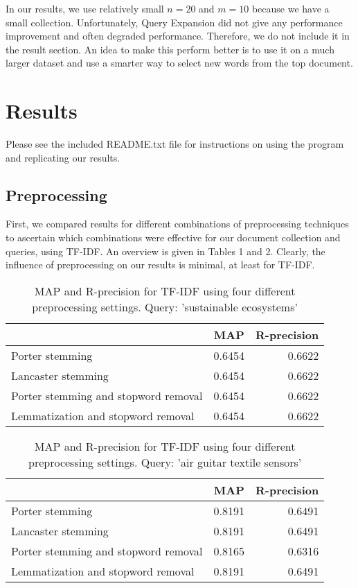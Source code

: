 \documentclass{article}
\begin{document}
In our results, we use relatively small $n = 20$ and $m = 10$ because we have a small collection. Unfortunately, Query Expansion did not give any performance improvement and often degraded performance. Therefore, we do not include it in the result section. An idea to make this perform better is to use it on a much larger dataset and use a smarter way to select new words from the top document.

\section*{Results}

Please see the included README.txt file for instructions on using the program and replicating our results.

\subsection*{Preprocessing}

First, we compared results for different combinations of preprocessing techniques to ascertain which combinations were effective for our document collection and queries, using TF-IDF. An overview is given in Tables 1 and 2. Clearly, the influence of preprocessing on our results is minimal, at least for TF-IDF.

\begin{table}[h]
\begin{tabular}{|l|c|r|}
\hline
 & MAP & R-precision \\ \hline
Porter stemming & 0.6454 & 0.6622 \\ \hline
Lancaster stemming & 0.6454 & 0.6622 \\ \hline
Porter stemming and stopword removal & 0.6454 & 0.6622 \\ \hline
Lemmatization and stopword removal & 0.6454 & 0.6622 \\ \hline
\end{tabular}
\caption{MAP and R-precision for TF-IDF using four different preprocessing settings. Query: 'sustainable ecosystems'}
\end{table}
\begin{table}[h]
\begin{tabular}{|l|c|r|}
\hline
 & MAP & R-precision \\ \hline
Porter stemming & 0.8191 & 0.6491 \\ \hline
Lancaster stemming & 0.8191 & 0.6491 \\ \hline
Porter stemming and stopword removal & 0.8165 & 0.6316 \\ \hline
Lemmatization and stopword removal & 0.8191 & 0.6491 \\ \hline
\end{tabular}
\caption{MAP and R-precision for TF-IDF using four different preprocessing settings. Query: 'air guitar textile sensors'} 
\end{table} 
\end{document}
